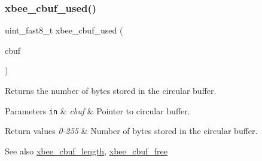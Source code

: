 \subsubsection{\texorpdfstring{xbee\+\_\+cbuf\+\_\+used()}{xbee\_cbuf\_used()}}
{\footnotesize\ttfamily uint\+\_\+fast8\+\_\+t xbee\+\_\+cbuf\+\_\+used (\begin{DoxyParamCaption}\item[{\hyperlink{structxbee__cbuf__t}{xbee\+\_\+cbuf\+\_\+t} \hyperlink{group__hal_gaef060b3456fdcc093a7210a762d5f2ed}{F\+AR} $\ast$}]{cbuf }\end{DoxyParamCaption})}



Returns the number of bytes stored in the circular buffer. 


\begin{DoxyParams}[1]{Parameters}
\mbox{\tt in}  & {\em cbuf} & Pointer to circular buffer.\\
\hline
\end{DoxyParams}

\begin{DoxyRetVals}{Return values}
{\em 0-\/255} & Number of bytes stored in the circular buffer.\\
\hline
\end{DoxyRetVals}
\begin{DoxySeeAlso}{See also}
\hyperlink{group__util__cbuf_gaa3f9edea3274c2d62f09768c38fe6a1d}{xbee\+\_\+cbuf\+\_\+length}, \hyperlink{group__util__cbuf_ga9a2eeedf642bdf31dba98aacdc5a7d75}{xbee\+\_\+cbuf\+\_\+free} 
\end{DoxySeeAlso}
